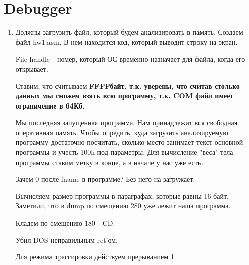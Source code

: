 \section*{Debugger}
\begin{enumerate}
\item Должны загрузить файл, который будем анализировать в память. Создаем файл hw1.asm. В нем находится код, который выводит строку на экран.

File handle - номер, который ОС временно назначает для файла, когда его открывает.

Ставим, что считываем \bfseries FFFF\mdseries байт, т.к. уверены, что считав столько данных мы сможем взять всю программу, т.к. COM файл имеет ограничение в 64Кб.

Мы последняя запущенная программа. Нам принадлежит вся свободная оперативная память. Чтобы опредить, куда загрузить анализируемую программу достаточно посчитать, сколько место занимает текст основной программы и учесть 100h под параметры. Для вычисление "веса" тела программы ставим метку в конце, а в начале у нас уже есть. 

Зачем 0 после fname в программе? Без него на загружает.

Вычисляем размер программы в параграфах, которые равны 16 байт.
Заметили, что в dump по смещению 280 уже лежит наша программа.

Кладем по смещению 180 - CD.

Убил DOS неправильным ret'ом.

Для режима трассировки действуем прерыванием 1.
\end{enumerate}